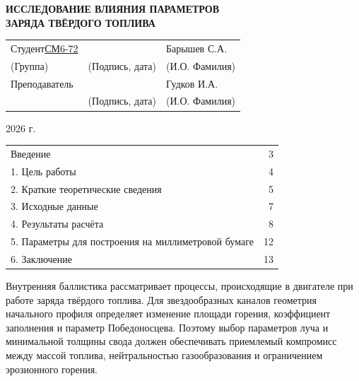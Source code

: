 \documentclass[a4paper,12pt]{article}
\newcommand{\heading}[1]{%
          \par\noindent{\centering\fontsize{16pt}{24pt}\selectfont\bfseries #1\par}%
        }
\begin{document}
\begin{titlepage}
\begin{center}
          {\fontsize{18}{22}\selectfont\bfseries ИССЛЕДОВАНИЕ ВЛИЯНИЯ ПАРАМЕТРОВ}\\
          {\fontsize{18}{22}\selectfont\bfseries ЗАРЯДА ТВЁРДОГО ТОПЛИВА}
        \end{center}
        \vspace{10mm}
        \noindent\begin{tabular}{@{}p{40mm}p{54mm}p{62mm}@{}}
        Студент\hspace{4mm}\underline{СМ6-72} & \hfill\underline{\hspace{36mm}} & Барышев С.А.\\[-1mm]
        \hspace{17mm}(Группа) & \hfill(Подпись, дата) & \hfill(И.О. Фамилия)\\[10mm]
        Преподаватель & \hfill\underline{\hspace{36mm}} & Гудков И.А.\\[-1mm]
        \hspace{28mm} & \hfill(Подпись, дата) & \hfill(И.О. Фамилия)
        \end{tabular}
        \vfill
        \begin{center}2026 г.\end{center}
        \end{titlepage}

        \setcounter{page}{2}
        \heading{Содержание}
        \noindent\begin{tabular}{@{}p{}r@{}}
        Введение & 3\\
        1. Цель работы & 4\\
        2. Краткие теоретические сведения & 5\\
        3. Исходные данные & 7\\
        4. Результаты расчёта & 8\\
        5. Параметры для построения на миллиметровой бумаге & 12\\
        6. Заключение & 13
        \end{tabular}


        \clearpage
        \heading{Введение}
        Внутренняя баллистика рассматривает процессы, происходящие в двигателе при работе заряда твёрдого топлива. Для звездообразных каналов геометрия начального профиля определяет изменение площади горения, коэффициент заполнения и параметр Победоносцева. Поэтому выбор параметров луча и минимальной толщины свода должен обеспечивать приемлемый компромисс между массой топлива, нейтральностью газообразования и ограничением эрозионного горения.
\end{document}
